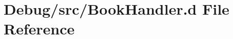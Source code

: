 \hypertarget{_book_handler_8d}{}\section{Debug/src/\+Book\+Handler.d File Reference}
\label{_book_handler_8d}
